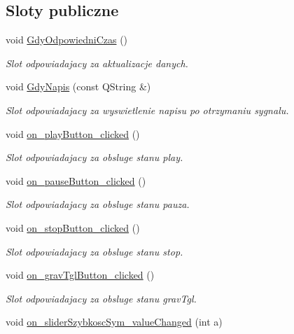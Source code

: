 \subsection*{Sloty publiczne}
\begin{DoxyCompactItemize}
\item 
void \hyperlink{class_okno_glowne_a2a49d3696ef8a42325313842768f2c92}{Gdy\-Odpowiedni\-Czas} ()
\begin{DoxyCompactList}\small\item\em Slot odpowiadajacy za aktualizacje danych. \end{DoxyCompactList}\item 
void \hyperlink{class_okno_glowne_a2a59f13292adfead4ac821780220044a}{Gdy\-Napis} (const Q\-String \&)
\begin{DoxyCompactList}\small\item\em Slot odpowiadajacy za wyswietlenie napisu po otrzymaniu sygnalu. \end{DoxyCompactList}\item 
void \hyperlink{class_okno_glowne_ac837b1f8c8b0288d07987e059966431b}{on\-\_\-play\-Button\-\_\-clicked} ()
\begin{DoxyCompactList}\small\item\em Slot odpowiadajacy za obsluge stanu play. \end{DoxyCompactList}\item 
void \hyperlink{class_okno_glowne_ae8bd560de9aa835ba8b194b8f7da094c}{on\-\_\-pause\-Button\-\_\-clicked} ()
\begin{DoxyCompactList}\small\item\em Slot odpowiadajacy za obsluge stanu pauza. \end{DoxyCompactList}\item 
void \hyperlink{class_okno_glowne_a63255adc6263a1ee6f67c96b91446b73}{on\-\_\-stop\-Button\-\_\-clicked} ()
\begin{DoxyCompactList}\small\item\em Slot odpowiadajacy za obsluge stanu stop. \end{DoxyCompactList}\item 
void \hyperlink{class_okno_glowne_a0c07c0f31c7b79e053ffb6e606ff5293}{on\-\_\-grav\-Tgl\-Button\-\_\-clicked} ()
\begin{DoxyCompactList}\small\item\em Slot odpowiadajacy za obsluge stanu grav\-Tgl. \end{DoxyCompactList}\item 
void \hyperlink{class_okno_glowne_a726ce3fbe89c3fb7364c39e99c0ad658}{on\-\_\-slider\-Szybkosc\-Sym\-\_\-value\-Changed} (int a)

\end{DoxyCompactItemize}
